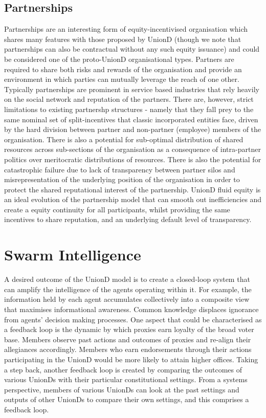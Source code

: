 \documentclass[12pt,twocolumn]{article}
\begin{document}
\subsection{Partnerships}

Partnerships are an interesting form of equity-incentivised organisation which shares many features with those proposed by UnionD (though we note that partnerships can also be contractual without any such equity issuance) and could be considered one of the proto-UnionD organisational types. Partners are required to share both risks and rewards of the organisation and provide an environment in which parties can mutually leverage the reach of one other. Typically partnerships are prominent in service based industries that rely heavily on the social network and reputation of the partners. There are, however, strict limitations to existing partnershp structures - namely that they fall prey to the same nominal set of split-incentives that classic incorporated entities face, driven by the hard division between partner and non-partner (employee) members of the organisation. There is also a potential for sub-optimal distribution of shared resources across sub-sections of the organisation as a consequence of intra-partner politics over meritocratic distributions of resources. There is also the potential for catastrophic failure due to lack of transparency between partner silos and misrepresentation of the underlying position of the organisation in order to protect the shared reputational interest of the partnership. UnionD fluid equity is an ideal evolution of the partnership model that can smooth out inefficiencies and create a equity continuity for all participants, whilst providing the same incentives to share reputation, and an underlying default level of transparency.

\section {Swarm Intelligence}

A desired outcome of the UnionD model is to create a closed-loop system that can amplify the intelligence of the agents operating within it. For example, the information held by each agent accumulates collectively into a composite view that maximises informational awareness. Common knowledge displaces ignorance from agents' decision making processes. One aspect that could be characterised as a feedback loop is the dynamic by which proxies earn loyalty of the broad voter base. Members observe past actions and outcomes of proxies and re-align their allegiances accordingly. Members who earn endorsements through their actions participating in the UnionD would be more likely to attain higher offices. Taking a step back, another feedback loop is created by comparing the outcomes of various UnionDs with their particular constitutional settings. From a systems perspective, members of various UnionDs can look at the past settings and outputs of other UnionDs to compare their own settings, and this comprises a feedback loop. 
\end{document}
